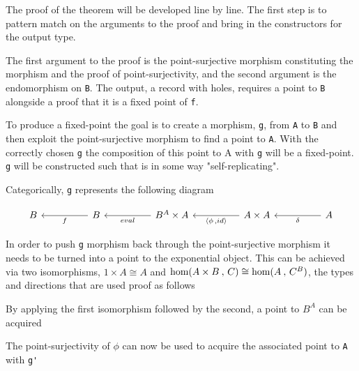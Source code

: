 The proof of the theorem will be developed line by line. The first step is to
pattern match on the arguments to the proof and bring in the constructors for
the output type.

\begin{AgdaMultiCode}
\end{AgdaMultiCode}

The first argument to the proof is the point-surjective morphism constituting
the morphism and the proof of point-surjectivity, and the second argument is the
endomorphism on \verb|B|. The output, a record with holes, requires a point to
\verb|B| alongside a proof that it is a fixed point of \verb|f|.

To produce a fixed-point the goal is to create a morphism, \verb|g|,  from \verb|A| to
\verb|B| and then exploit the point-surjective morphism to find a point to
\verb|A|. With the correctly chosen \verb|g| the composition of this point to A
with \verb|g| will be a fixed-point. \verb|g| will be constructed such that is
in some way "self-replicating".


Categorically, \verb|g| represents the following diagram

\[\begin{tikzcd}[sep=huge]
    B & B \arrow[l, "f"] & B^A \times A \arrow[l, "eval"] & A \times A \arrow[l,
    "{\langle \phi \, , id\rangle}"] & A \arrow[l, "\delta"]
\end{tikzcd}\]

In order to push \verb|g| morphism back through the point-surjective morphism
it needs to be turned into a point to the exponential object. This can be
achieved via two isomorphisms, $1 \times A \cong A$ and $\textnormal{hom}(A \times B \: , \, C)
\cong \textnormal{hom}(A \: , \, C^B)$, the types and directions that are used proof as
follows

\begin{AgdaMultiCode}
\end{AgdaMultiCode}

By applying the first isomorphism followed by the second, a point to $B^A$ can
be acquired
\begin{AgdaAlign}

The point-surjectivity of $\phi$ can now be used to acquire the associated point
to \verb|A| with \verb|g'|

\end{AgdaAlign}

